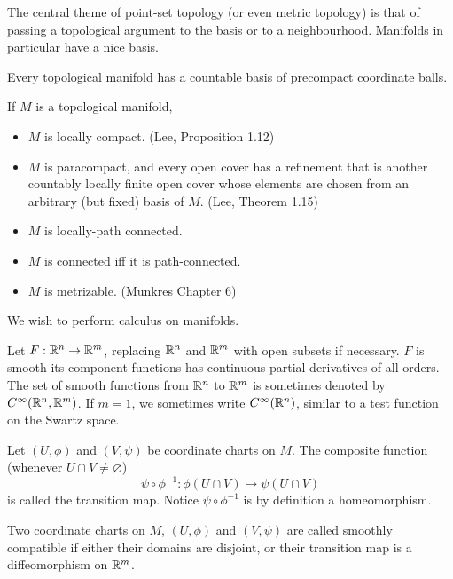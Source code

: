 \documentclass[../main-manifolds.tex]{subfiles}
\begin{document}
The central theme of point-set topology (or even metric topology) is that of passing a topological argument to the basis or to a neighbourhood. Manifolds in particular have a nice basis.
\begin{wts}
    Every topological manifold has a countable basis of precompact coordinate balls.
\end{wts}
\begin{wts}
If $M$ is a topological manifold, 
\begin{itemize}
    \item $M$ is locally compact. (Lee, Proposition 1.12)
    \item $M$ is paracompact, and every open cover has a refinement 
    that is another countably locally finite open cover whose elements are chosen from an arbitrary (but fixed) basis of $M$. (Lee, Theorem 1.15)
    \item $M$ is locally-path connected.
    \item $M$ is connected iff it is path-connected.
    \item $M$ is metrizable. (Munkres Chapter 6)
\end{itemize}
\end{wts}

We wish to perform calculus on manifolds.
\begin{definition}\label{lee-chp1:real-smooth-function}
    Let $F:{\mathbb{R}^n}\to{\mathbb{R}^m}$, replacing ${\mathbb{R}^n}$ and ${\mathbb{R}^m}$ with open subsets if necessary. $F$ is smooth its component functions has continuous partial derivatives of all orders. The set of smooth functions from ${\mathbb{R}^n}$ to ${\mathbb{R}^m}$ is sometimes denoted by $\cinf[\realn,\realm]$. If $m=1$, we sometimes write $\cinf[\realn]$, similar to a test function on the Swartz space.
\end{definition}

\begin{definition}\label{lee-chp1:transition-maps}
    Let $(U,\phi)$ and $(V,\psi)$ be coordinate charts on $M$. The composite function (whenever $U\cap V\neq\varnothing$) 
    \[
    \psi\circ\phi^{-1}:\phi(U\cap V)\to\psi(U\cap V)
    \] 
    is called the transition map. Notice $\psi\circ\phi^{-1}$ is by definition a homeomorphism.
\end{definition}

\begin{definition}\label{lee-chp1:smoothly-compatible}
    Two coordinate charts on $M$, $(U,\phi)$ and $(V,\psi)$ are called smoothly compatible if either their domains are disjoint, or their transition map is a diffeomorphism on ${\mathbb{R}^m}$.
\end{definition}
\end{document}
